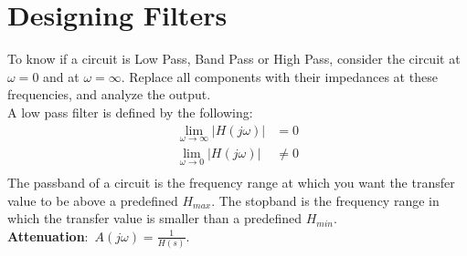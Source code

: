 \documentclass[nobib]{tufte-handout}
\newcommand{\defn}[2]{\noindent\textbf{#1}:\ #2}
\begin{document}
\section{Designing Filters}
To know if a circuit is Low Pass, Band Pass or High Pass, consider the circuit
at $\omega = 0$ and at $\omega = \infty$. Replace all components with their
impedances at these frequencies, and analyze the output.\\ A low pass filter is
defined by the following:
\begin{align*}
    \lim_{\omega \rightarrow \infty} |H(j\omega)| & = 0    \\
    \lim_{\omega \rightarrow 0} |H(j\omega)|      & \neq 0 \\
\end{align*}
The passband of a circuit is the frequency range at which you want the transfer value to be above a predefined $H_{max}$. The stopband is the frequency range in which the transfer value is smaller than a predefined $H_{min}$.\\
\defn{Attenuation}{$A(j\omega) = \frac{1}{H(s)}$}.\\
\end{document}
